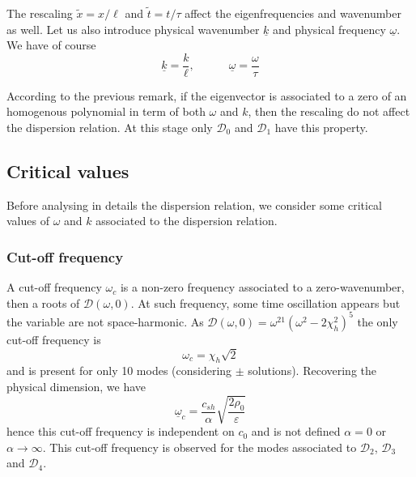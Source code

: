 \documentclass[
10pt, %
a4paper, %
oneside, %
headinclude,footinclude, %
table
]{scrartcl}
\begin{document}
\begin{remark}
The rescaling $\tilde{x}=x/\ell$ and $\tilde{t}=t/\tau$ affect the 
eigenfrequencies and wavenumber as well. Let us also introduce physical wavenumber $\underline{k}$ 
and physical frequency $\underline{\omega}$. We have of course 
\begin{equation}\label{phys.k.omega}
\underline{k}=\frac{k}{\ell}, \quad\quad\quad
\underline{\omega}=\frac{\omega}{\tau}
\end{equation}
\end{remark}


\begin{remark} According to the previous remark, if the eigenvector is associated to a zero of an 
homogenous polynomial in term of both $\omega$ and $k$, then  the rescaling do not affect the 
dispersion relation. At this stage only $\mathcal{D}_{0}$ and $\mathcal{D}_{1}$ have this property. 
\end{remark}

\subsection{Critical values}
Before analysing in details the dispersion relation, we consider some critical values of $\omega$ 
and $k$ associated to the dispersion relation.
\subsubsection{Cut-off frequency}
A cut-off frequency $\omega_{c}$ is a non-zero frequency associated to a zero-wavenumber, then a roots of $\mathcal{D}(\omega,0)$. At such frequency, some time oscillation appears but the variable are not space-harmonic. As $\mathcal{D}(\omega,0)=\omega^{21}(\omega^2-2 \chi_{h}^2)^5$ the only cut-off frequency is 
$$
\boxed{\omega_{c}=\chi_{h}\sqrt{2}}
$$
and is present for only 10 modes (considering $\pm$ solutions). Recovering the physical dimension, 
we have
 $$
\underline{\omega}_{c}=\frac{c_{sh}}{\alpha} \sqrt{\frac{2\rho_{0}}{\varepsilon}}
 $$
 hence this cut-off frequency is independent on $c_{0}$ and is not defined $\alpha=0$ or $\alpha\to\infty$. This cut-off frequency is observed for the modes associated to $\mathcal{D}_{2}$, $\mathcal{D}_{3}$ and $\mathcal{D}_{4}$.
 
\end{document}
